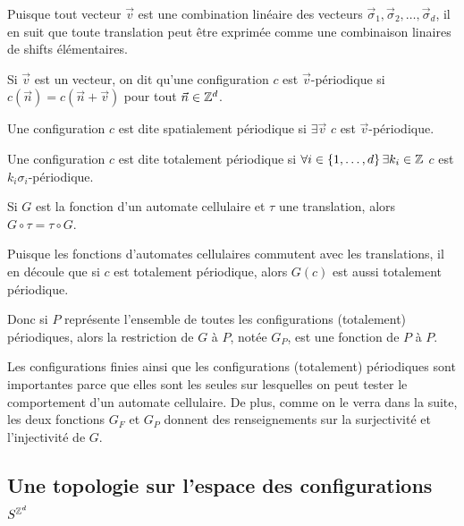 Puisque tout vecteur $\vec v$ est une combination linéaire des vecteurs $\vec \sigma_1, \vec \sigma_2, \ldots, \vec \sigma_d$, il en suit que
toute translation peut être exprimée comme une combinaison linaires de shifts élémentaires.

\begin{definition}
	Si $\vec v$ est un vecteur, on dit qu'une configuration $c$ est $\vec v$-périodique si  $c(\vec n) = c (\vec n + \vec v)$ pour tout $\vec n \in \mathbb{Z} ^d$.
\end{definition}

\begin{exemple}
	\todo{~}
\end{exemple}

\begin{definition}
	Une configuration $c$ est dite spatialement périodique si $\exists \vec v$ \tq $c$ est $\vec v$-périodique.
\end{definition}

\begin{definition}
	Une configuration $c$ est dite totalement périodique si $\forall i \in \left\{1,\ldots,d\right\}\exists k_i\in \mathbb{Z}$ \tq $c$ est $k_i\sigma_i$-périodique.
\end{definition}

\begin{prop}
	Si $G$ est la fonction d'un automate cellulaire et $\tau$ une translation, alors $G \circ \tau = \tau \circ G$.
\end{prop}

Puisque les fonctions d'automates cellulaires commutent avec les translations, il en découle que si $c$ est totalement périodique, alors $G(c)$
est aussi totalement périodique.

Donc si $P$ représente l'ensemble de toutes les configurations (totalement) périodiques, alors la restriction de $G$ à $P$,  notée $G_P$, est une fonction de $P$ à $P$.

Les configurations finies ainsi que les configurations (totalement) périodiques sont importantes parce que elles sont les seules sur
lesquelles on peut tester le comportement d'un automate cellulaire. De plus, comme on le verra dans la suite,  les deux fonctions $G_F$
et $G_P$ donnent des renseignements sur la surjectivité et l'injectivité de $G$.



\subsection{Une topologie sur l'espace des configurations $S^{\mathbb{Z}^d}$}


